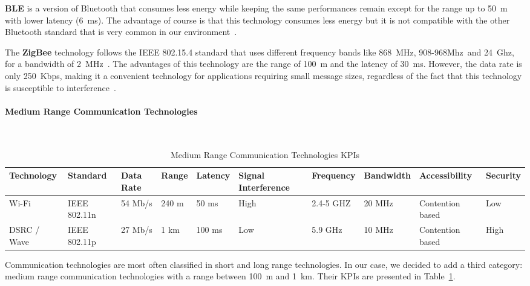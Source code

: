 \textbf{\acrfull{BLE}} is a version of Bluetooth that consumes less energy while keeping the same performances remain except for the range up to 50~m with lower latency (6~ms). The advantage of course is that this technology consumes less energy but it is not compatible with the other Bluetooth standard that is very common in our environment~\cite{ahangar_survey_2021}. 

The \textbf{ZigBee} technology follows the IEEE 802.15.4 standard that uses different frequency bands like 868~MHz, 908-968Mhz~and 24~Ghz, for a bandwidth of 2~MHz~\cite{ahangar_survey_2021}. The advantages of this technology are the range of 100~m and the latency of 30~ms. However, the data rate is only 250~Kbps, making it a convenient technology for applications requiring small message sizes, regardless of the fact that this technology is susceptible to interference~\cite{anwer_survey_2014,ahangar_survey_2021,shree_novel_2016,selvarajah_zigbee_2008}. 



\paragraph{Medium Range Communication Technologies}\ \\

\begin{table}[ht!]
  \centering
  \caption{Medium Range Communication Technologies \acrshort{KPI}s}
  \label{tab:medium-range-com}
  \begin{tabular}{p{} p{1cm} p{1cm} p{1cm} p{1cm} p{1.5cm} p{1.2cm} p{1.3cm} p{1.4cm} p{1.4cm}}
    \hline
    Technology & Standard & Data Rate & Range  & Latency & Signal Interference  & Frequency &  Bandwidth & Accessibility & Security\\
    \hline
    Wi-Fi &  IEEE 802.11n  &  54 Mb/s	&   240 m &  50 ms  & High & 2.4-5 GHZ	 & 20 MHz	 & Contention based&	Low\\
    
    DSRC / Wave  & IEEE 802.11p	& 27 Mb/s	& 1 km&	100 ms  & Low &  5.9 GHz	& 10 MHz& 	Contention based &	High\\
    \hline	
  \end{tabular}
\end{table}

Communication technologies are most often classified in short and long range technologies. In our case, we decided to add a third category: medium range communication technologies with a range between 100~m and 1~km. Their \acrshort{KPI}s are presented in Table~\ref{tab:medium-range-com}.%

